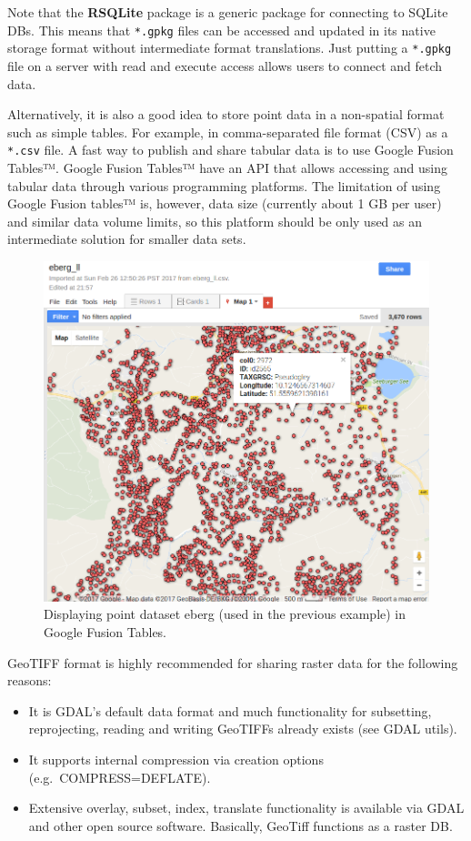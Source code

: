 \documentclass[10pt,b5paper,]{book}
\providecommand{\tightlist}{%
  \setlength{\itemsep}{0pt}\setlength{\parskip}{0pt}}
\theoremstyle{definition}
\theoremstyle{definition}
\theoremstyle{definition}
\theoremstyle{remark}
\begin{document}
Note that the \textbf{RSQLite} package is a generic package for
connecting to SQLite DBs. This means that \texttt{*.gpkg} files can be
accessed and updated in its native storage format without intermediate
format translations. Just putting a \texttt{*.gpkg} file on a server
with read and execute access allows users to connect and fetch data.

Alternatively, it is also a good idea to store point data in a
non-spatial format such as simple tables. For example, in
comma-separated file format (CSV) as a \texttt{*.csv} file. A fast way
to publish and share tabular data is to use Google Fusion Tables™.
Google Fusion Tables™ have an API that allows accessing and using
tabular data through various programming platforms. The limitation of
using Google Fusion tables™ is, however, data size (currently about 1 GB
per user) and similar data volume limits, so this platform should be
only used as an intermediate solution for smaller data sets.

\begin{figure}
\centering
\includegraphics{images/Data_sharing_eberg.png}
\caption{Displaying point dataset eberg (used in the previous example)
in Google Fusion Tables.}
\end{figure}

GeoTIFF format is highly recommended for sharing raster data for the
following reasons:

\begin{itemize}
\tightlist
\item
  It is GDAL's default data format and much functionality for
  subsetting, reprojecting, reading and writing GeoTIFFs already exists
  (see GDAL utils).
\item
  It supports internal compression via creation options
  (e.g.~COMPRESS=DEFLATE).
\item
  Extensive overlay, subset, index, translate functionality is available
  via GDAL and other open source software. Basically, GeoTiff functions
  as a raster DB.
\end{itemize}
\end{document}
